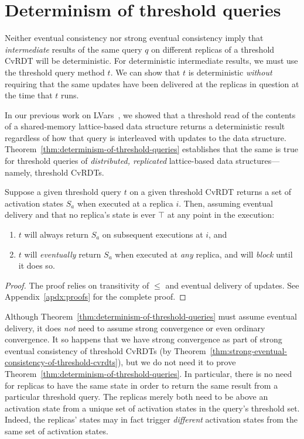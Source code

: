 \section{Determinism of threshold queries}\label{s:results}

Neither eventual consistency nor strong eventual consistency imply
that \emph{intermediate} results of the same query $q$ on different
replicas of a threshold CvRDT will be deterministic.  For
deterministic intermediate results, we must use the threshold query
method $t$.  We can show that $t$ is deterministic \emph{without}
requiring that the same updates have been delivered at the replicas in
question at the time that $t$ runs.

In our previous work on LVars~\cite{LVars-paper,Freeze-paper}, we
showed that a threshold read of the contents of a shared-memory
lattice-based data structure returns a deterministic result regardless
of how that query is interleaved with updates to the data structure.
Theorem~\ref{thm:determinism-of-threshold-queries} establishes that
the same is true for threshold queries of \emph{distributed,
  replicated} lattice-based data structures---namely, threshold
CvRDTs.

\begin{theorem}
  \label{thm:determinism-of-threshold-queries}
  Suppose a given threshold query $t$ on a given threshold CvRDT
  returns a set of activation states $S_a$ when executed at a replica
  $i$.  Then, assuming eventual delivery and that no replica's state
  is ever $\top$ at any point in the execution:
  \begin{enumerate}
  \item $t$ will always return $S_a$ on subsequent executions at $i$,
    and
  \item $t$ will \emph{eventually} return $S_a$ when executed at
    \emph{any} replica, and will \emph{block} until it does so.
  \end{enumerate}
\end{theorem}
\begin{proof}
The proof relies on transitivity of $\leq$ and eventual delivery of
updates.  See Appendix~\ref{apdx:proofs} for the complete proof.
\end{proof}
Although Theorem~\ref{thm:determinism-of-threshold-queries} must
assume eventual delivery, it does \emph{not} need to assume strong
convergence or even ordinary convergence.  It so happens that we have
strong convergence as part of strong eventual consistency of threshold
CvRDTs (by
Theorem~\ref{thm:strong-eventual-consistency-of-threshold-cvrdts}),
but we do not need it to prove
Theorem~\ref{thm:determinism-of-threshold-queries}.  In particular,
there is no need for replicas to have the same state in order to
return the same result from a particular threshold query.  The
replicas merely both need to be above an activation state from a
unique set of activation states in the query's threshold set.  Indeed,
the replicas' states may in fact trigger \emph{different} activation
states from the same set of activation states.

